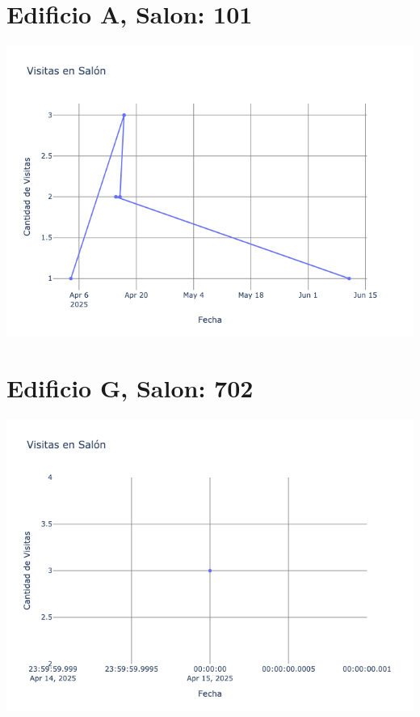 \documentclass{article}
\begin{document}
    \section{Edificio A, Salon: 101}
    \noindent
    \begin{minipage}{0.48\textwidth}
        \centering
        \includegraphics[width=\textwidth]{../img/poli/VS101-180Dias-26-09-2025.png}
    \end{minipage}
    

    \section{Edificio G, Salon: 702}
    \noindent
    \begin{minipage}{0.48\textwidth}
        \centering
        \includegraphics[width=\textwidth]{../img/poli/VS702-180Dias-26-09-2025.png}
    \end{minipage}
    

    
\end{document}
